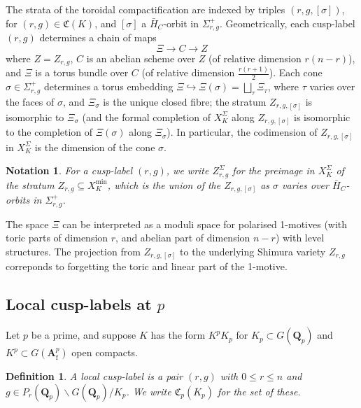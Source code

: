 \documentclass[cjm]{ipart}
\theoremstyle{plain}
\newtheorem{definition}[theorem]{Definition}
\newtheorem{notation}[theorem]{Notation}
\theoremstyle{remark}
\newcommand{\Af}{\AA_{\mathrm{f}}}
\newcommand{\QQ}{\mathbf{Q}}
\newcommand{\Qp}{\QQ_p}
\newcommand{\into}{\hookrightarrow}
\renewcommand{\AA}{\mathbf{A}}
\numberwithin{equation}{subsection}
\renewcommand{\le}{\leqslant}
\begin{document}
  The strata of the toroidal compactification are indexed by triples $(r, g, [\sigma])$, for $(r, g) \in \mathfrak{C}(K)$, and $[\sigma]$ a $\bar{H}_C$-orbit in $\Sigma_{r, g}^+$. Geometrically, each cusp-label $(r, g)$ determines a chain of maps
  \[ \Xi \to C \to Z \]
  where $Z = Z_{r, g}$, $C$ is an abelian scheme over $Z$ (of relative dimension $r(n-r)$), and $\Xi$ is a torus bundle over $C$ (of relative dimension $\tfrac{r(r+1)}{2}$). Each cone $\sigma \in \Sigma_{r, g}^+$ determines a torus embedding $\Xi \into \Xi(\sigma) = \bigsqcup_{\tau} \Xi_{\tau}$, where $\tau$ varies over the faces of $\sigma$, and $\Xi_{\sigma}$ is the unique closed fibre; the stratum $Z_{r, g, [\sigma]}$ is isomorphic to $\Xi_{\sigma}$ (and the formal completion of $X_K^{\Sigma}$ along $Z_{r, g, [\sigma]}$ is isomorphic to the completion of $\Xi(\sigma)$ along $\Xi_{\sigma}$). In particular, the codimension of $Z_{r, g, [\sigma]}$ in $X_K^{\Sigma}$ is the dimension of the cone $\sigma$.
  
  \begin{notation} For a cusp-label $(r, g)$, we write $Z_{r, g}^{\Sigma}$ for the preimage in $X_{K}^{\Sigma}$ of the stratum $Z_{r, g} \subseteq X_K^{\min}$, which is the union of the $Z_{r, g, [\sigma]}$ as $\sigma$ varies over $\bar{H}_C$-orbits in $\Sigma_{r, g}^+$.
  \end{notation}

  \begin{remark}
   The space $\Xi$ can be interpreted as a moduli space for polarised 1-motives (with toric parts of dimension $r$, and abelian part of dimension $n - r$) with level structures. The projection from $Z_{r, g, [\sigma]}$ to the underlying Shimura variety $Z_{r, g}$ correponds to forgetting the toric and linear part of the 1-motive.
  \end{remark}

 \subsection{Local cusp-labels at \texorpdfstring{$p$}{p}}

  Let $p$ be a prime, and suppose $K$ has the form $K^p K_p$ for $K_p \subset G(\Qp)$ and $K^p \subset G(\Af^p)$ open compacts.

  \begin{definition}
   A \emph{local cusp-label} is a pair $(r, g)$ with $0 \le r \le n$ and $g \in P_r(\Qp) \backslash G(\Qp) / K_p$. We write $\mathfrak{C}_p(K_p)$ for the set of these.
  \end{definition}
\end{document}
